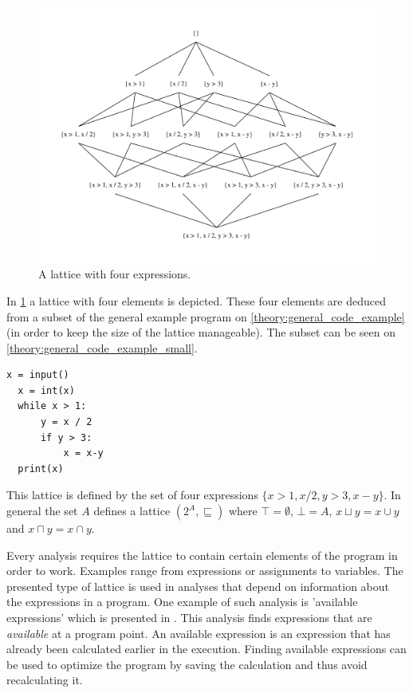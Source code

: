 \begin{figure}
\begin{center}
\includegraphics[width=\textwidth]{figures/dot_files/lattice_example.pdf}
\end{center}
\caption{A lattice with four expressions.}
\label{lattice_example}
\end{figure}

In \cref{lattice_example} a lattice with four elements is depicted.
These four elements are deduced from a subset of the general example program on \cref{theory:general_code_example}(in order to keep the size of the lattice manageable).
The subset can be seen on \cref{theory:general_code_example_small}.

\begin{lstlisting}[style=python, caption={The general code example used throughout the theory chapter}, label={theory:general_code_example_small}]
  x = input()
  x = int(x)
  while x > 1:
      y = x / 2
      if y > 3:
          x = x-y
  print(x)
\end{lstlisting}

This lattice is defined by the set of four expressions $\{x > 1, x / 2, y > 3, x - y \}$.
In general the set $A$ defines a lattice $(2^A, \sqsubseteq )$ where $\top = \emptyset$, $\bot = A$, $x\sqcup y = x \cup y$ and $x \sqcap y = x \cap y$.

Every analysis requires the lattice to contain certain elements of the program in order to work.
Examples range from expressions or assignments to variables.
The presented type of lattice is used in analyses that depend on information about the expressions in a program.
One example of such analysis is 'available expressions' which is presented in \citet[p.~22]{schwartzbach}.
This analysis finds expressions that are \emph{available} at a program point.
An available expression is an expression that has already been calculated earlier in the execution.
Finding available expressions can be used to optimize the program by saving the calculation and thus avoid recalculating it.



